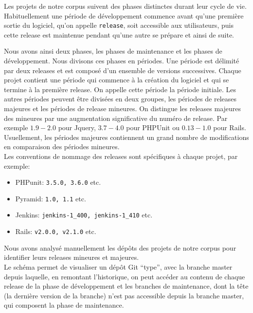 Les projets de notre corpus suivent des phases distinctes durant leur cycle de vie. Habituellement une période de développement commence avant qu'une première sortie du logiciel, qu'on appelle \texttt{release}, soit accessible aux utilisateurs, puis cette release est maintenue pendant qu'une autre se prépare et ainsi de suite.

Nous avons ainsi deux phases, les phases de maintenance et les phases de développement. Nous divisons ces phases en périodes. Une période est délimité par deux releases et est composé d'un ensemble de versions successives. Chaque projet contient une période qui commence à la création du logiciel et qui se termine à la première release. On appelle cette période la période initiale. Les autres périodes peuvent être divisées en deux groupes, les périodes de releases majeures et les périodes de release mineures. On distingue les releases majeures des mineures par une augmentation significative du numéro de release. Par exemple $1.9-2.0$ pour Jquery, $3.7-4.0$ pour PHPUnit ou $0.13-1.0$ pour Rails. Usuellement, les périodes majeures contiennent un grand nombre de modifications en comparaison des périodes mineures.\\

Les conventions de nommage des releases sont spécifiques à chaque projet, par exemple:
\begin{itemize}
\item PHPunit: \texttt{3.5.0, 3.6.0} etc.
\item Pyramid: \texttt{1.0, 1.1} etc.
\item Jenkins: \texttt{jenkins-1\_400, jenkins-1\_410} etc.
\item Rails: \texttt{v2.0.0, v2.1.0} etc.
\end{itemize}
Nous avons analysé manuellement les dépôts des projets de notre corpus pour identifier leurs releases mineures et majeures.\\

Le schéma  permet de visualiser un dépôt Git ``type'', avec la branche master depuis laquelle, en remontant l'historique, on peut accéder au contenu de chaque release de la phase de développement et les branches de maintenance, dont la tête (la dernière version de la branche) n'est pas accessible depuis la branche master, qui composent la phase de maintenance.\\

